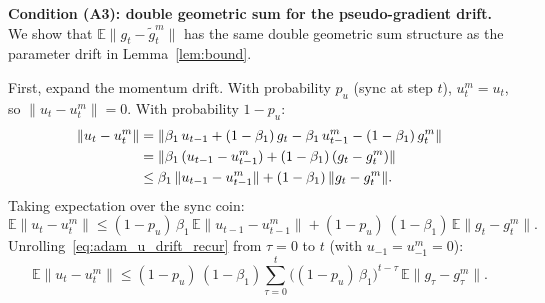 \documentclass{article}
\begin{document}
\medskip
\noindent\textbf{Condition (A3): double geometric sum for the pseudo-gradient drift.}
We show that $\mathbb{E}\|g_t - \widetilde{g}_t^m\|$ has the same double
geometric sum structure as the parameter drift in Lemma~\ref{lem:bound}.

First, expand the momentum drift. With probability $p_u$ (sync at step $t$),
$u_t^m = u_t$, so $\|u_t - u_t^m\| = 0$. With probability $1 - p_u$:
\begin{align}
\|u_t - u_t^m\|
&= \|\beta_1\,u_{t-1} + (1-\beta_1)\,g_t
   - \beta_1\,u_{t-1}^m - (1-\beta_1)\,g_t^m\| \notag \\
&= \|\beta_1\,(u_{t-1} - u_{t-1}^m) + (1-\beta_1)\,(g_t - g_t^m)\|
\notag \\
&\leq \beta_1\,\|u_{t-1} - u_{t-1}^m\|
  + (1-\beta_1)\,\|g_t - g_t^m\|.
\label{eq:adam_u_drift_one}
\end{align}
Taking expectation over the sync coin:
\begin{equation}
\mathbb{E}\|u_t - u_t^m\|
\leq (1-p_u)\,\beta_1\,\mathbb{E}\|u_{t-1} - u_{t-1}^m\|
  + (1-p_u)\,(1-\beta_1)\,\mathbb{E}\|g_t - g_t^m\|.
\label{eq:adam_u_drift_recur}
\end{equation}
Unrolling~\eqref{eq:adam_u_drift_recur} from $\tau = 0$ to $t$
(with $u_{-1} = u_{-1}^m = 0$):
\begin{equation}
\mathbb{E}\|u_t - u_t^m\|
\leq (1-p_u)\,(1-\beta_1)\sum_{\tau=0}^{t}
\bigl((1-p_u)\,\beta_1\bigr)^{t-\tau}\,
\mathbb{E}\|g_\tau - g_\tau^m\|.
\label{eq:adam_u_drift_unrolled}
\end{equation}
\end{document}
